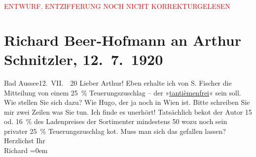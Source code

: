 
\begin{center}
            \textcolor{red}{ENTWURF. ENTZIFFERUNG NOCH NICHT KORREKTURGELESEN}
                      \end{center}
            
               \section[Richard Beer-Hofmann an Arthur Schnitzler, 12. 7. 1920]{ Richard Beer-Hofmann an Arthur Schnitzler,
               12. 7. 1920}\nopagebreak{}\rehead{ }\begin{ledgroupsized}[t]{13cm}\normalsize\beginnumbering{} \toendnotes[C]{\smallbreak\pagebreak[2]} 
\pstart
           {\pb}Bad Aussee12. VII.  20\pend
           \pstart
           Lieber Arthur! Eben erhalte ich von S. Fischer die Mitteilung von einem 25 {\%}
               Teuerungszuschlag – der »\uline{tantièmenfrei}« sein soll.
               Wie stellen Sie sich dazu? Wie Hugo, der ja noch
               in Wien ist. Bitte schreiben Sie mir zwei Zeilen was
               Sie tun. Ich finde es unerhört! Tatsächlich  beko{\geminationm}t der Autor 15
               od. 16 {\%} des Ladenpreises der Sortimenter mindestens 50 wozu
               noch sein privater {\pb}25 {\%} Teuerungszuschlag ko{\geminationm}t. Muss
               man sich das gefallen lassen?\pend
           \pstart
           Herzlichst Ihr{\\[\baselineskip]}\spacefill\mbox{Richard}\pend
           \leftskip=0em{}\endnumbering{}\end{ledgroupsized}  \newcommand{\dateiname}{L02348}\newcommand{\titel}{Richard Beer-Hofmann an Arthur Schnitzler, 12. 7. 1920}\newcommand{\editorInnen}{Martin Anton Müller und Gerd-Hermann Susen}
      